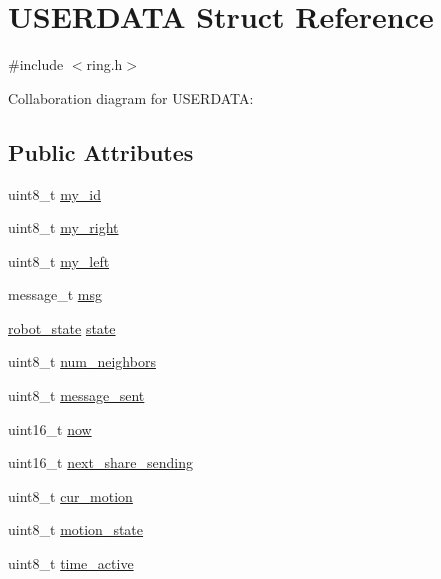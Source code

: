 \hypertarget{struct_u_s_e_r_d_a_t_a}{}\section{U\+S\+E\+R\+D\+A\+TA Struct Reference}
\label{struct_u_s_e_r_d_a_t_a}


{\ttfamily \#include $<$ring.\+h$>$}



Collaboration diagram for U\+S\+E\+R\+D\+A\+TA\+:
\subsection*{Public Attributes}
\begin{DoxyCompactItemize}
\item 
uint8\+\_\+t \hyperlink{struct_u_s_e_r_d_a_t_a_ac466d0aabad2b1c8e356a9560ae8913a}{my\+\_\+id}
\item 
uint8\+\_\+t \hyperlink{struct_u_s_e_r_d_a_t_a_a842f5ca3ed1c6c461e4e1d6e4cec0a49}{my\+\_\+right}
\item 
uint8\+\_\+t \hyperlink{struct_u_s_e_r_d_a_t_a_a7d0ce02a5de94525cf16e0580e0a415c}{my\+\_\+left}
\item 
message\+\_\+t \hyperlink{struct_u_s_e_r_d_a_t_a_a0d50136e317fd85cbd04f132f4fe8902}{msg}
\item 
\hyperlink{ring_8h_a69b20b1a04c8e4cf3b72851b966259ec}{robot\+\_\+state} \hyperlink{struct_u_s_e_r_d_a_t_a_aeed785c38cdfd9bc4356b47287f4cc33}{state}
\item 
uint8\+\_\+t \hyperlink{struct_u_s_e_r_d_a_t_a_aaa17d68b98a3923b1e67af7212d0ac52}{num\+\_\+neighbors}
\item 
uint8\+\_\+t \hyperlink{struct_u_s_e_r_d_a_t_a_a72ffa67773e8814cf580efd6534eaea4}{message\+\_\+sent}
\item 
uint16\+\_\+t \hyperlink{struct_u_s_e_r_d_a_t_a_afcf3cc6c2f239e554bc02618ab358e77}{now}
\item 
uint16\+\_\+t \hyperlink{struct_u_s_e_r_d_a_t_a_ae0685229eff329f48d65545f220fcfa8}{next\+\_\+share\+\_\+sending}
\item 
uint8\+\_\+t \hyperlink{struct_u_s_e_r_d_a_t_a_a776accb60751dfaaef71a780aa26565e}{cur\+\_\+motion}
\item 
uint8\+\_\+t \hyperlink{struct_u_s_e_r_d_a_t_a_a4084614536346cdd65a7c1e563c4f7b0}{motion\+\_\+state}
\item 
uint8\+\_\+t \hyperlink{struct_u_s_e_r_d_a_t_a_ac7d7ea7ea2501228ad03e408fd68c1cf}{time\+\_\+active}
\item 

\end{DoxyCompactItemize}
